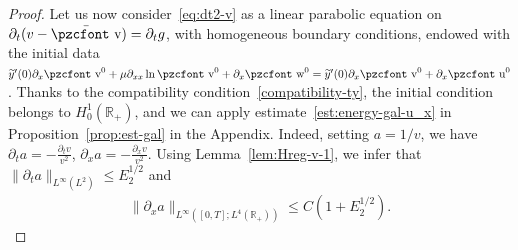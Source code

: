 \documentclass[10pt]{amsart}
\theoremstyle{definition}\newtheorem{defi}[theo]{Definition}\newtheorem{rema}[theo]{Remark}\newtheorem{exam}[theo]{Example}\newtheorem{exem}[theo]{Example}\newtheorem{nota}[theo]{Notation}
\newcommand{\mathpzc}[1]{\text{\pzcfont #1}}
\newcommand{\R}{\mathbb{R}}
\newcommand{\p}{\partial}
\newcommand{\bv}{\bar{\mathpzc{v}}}
\newcommand{\tv}{\mathpzc{v}}
\newcommand{\tu}{\mathpzc{u}}
\newcommand{\tw}{\mathpzc{w}}
\newcommand{\ty}{\widetilde{y}}
\begin{document}
\begin{proof}
Let us now consider~\eqref{eq:dt2-v} as a linear parabolic equation on $\p_t(v-\bv)=\p_t g$, with homogeneous boundary conditions, endowed with the initial data $\ty'(0)\p_x \tv^0 + \mu \p_{xx}\ln \tv^0 + \partial_x \tw^0= \ty'(0)\p_x \tv^0 + \p_x \tu^0$. Thanks to the compatibility condition~\eqref{compatibility-ty}, the initial condition belongs to $H^1_0(\R_+)$, and we can apply estimate~\eqref{est:energy-gal-u_x} in Proposition~\ref{prop:est-gal} in the Appendix. Indeed, setting $a = 1/v$, we have $\partial_t a = -\frac{\partial_t v}{v^2}$, $\partial_x a = -\frac{\partial_x v}{v^2}$. Using Lemma~\ref{lem:Hreg-v-1}, we infer that $\|\p_t a\|_{L^\infty(L^2)}\leq E_2^{1/2}$ and
\begin{align*}
\|\p_x a\|_{L^\infty\left([0,T];L^4(\R_+)\right)}\leq C\left(1+ E_2^{1/2}\right).
\end{align*}



\end{proof}
\end{document}

